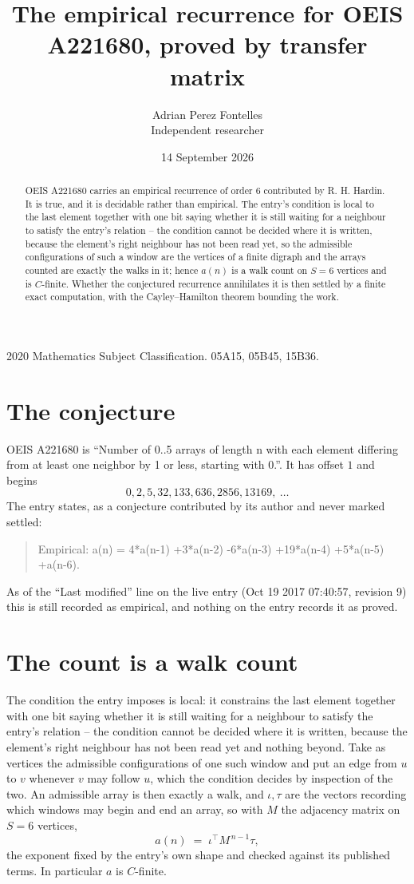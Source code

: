 \documentclass[11pt,a4paper]{article}
\title{The empirical recurrence for OEIS A221680, proved by transfer matrix}
\author{Adrian Perez Fontelles\\ \small Independent researcher}
\date{14 September 2026}
\theoremstyle{plain}
\theoremstyle{definition}
\begin{document}
\maketitle

\begin{abstract}
OEIS A221680 carries an empirical recurrence of order $6$ contributed by R. H. Hardin. It is
true, and it is decidable rather than empirical. The entry's condition is local to the last element together with one bit saying whether it is still waiting for a neighbour to satisfy the entry's relation -- the condition cannot be decided where it is written, because the element's right neighbour has not been read yet, so
the admissible configurations of such a window are the vertices of a finite digraph and the
arrays counted are exactly the walks in it; hence $a(n)$ is a walk count on $S=6$ vertices
and is $C$-finite. Whether the conjectured recurrence annihilates it is then settled by a
finite exact computation, with the Cayley--Hamilton theorem bounding the work.
\end{abstract}

\noindent\small 2020 Mathematics Subject Classification. 05A15, 05B45, 15B36.\normalsize

\section{The conjecture}

OEIS A221680 is ``Number of 0..5 arrays of length n with each element differing from at least one neighbor by 1 or less, starting with 0.''. It has offset $1$ and begins
\[
0, 2, 5, 32, 133, 636, 2856, 13169,\ \dots
\]
The entry states, as a conjecture contributed by its author and never marked settled:
\begin{quote}
Empirical: a(n) = 4*a(n-1) +3*a(n-2) -6*a(n-3) +19*a(n-4) +5*a(n-5) +a(n-6).
\end{quote}
As of the ``Last modified'' line on the live entry (Oct 19 2017 07:40:57, revision 9) this is still
recorded as empirical, and nothing on the entry records it as proved.

\section{The count is a walk count}

The condition the entry imposes is local: it constrains the last element together with one bit saying whether it is still waiting for a neighbour to satisfy the entry's relation -- the condition cannot be decided where it is written, because the element's right neighbour has not been read yet and nothing beyond. Take as vertices the admissible configurations of one such window and put an edge from $u$ to $v$ whenever $v$ may follow $u$, which the condition decides by inspection of the two.
An admissible array is then exactly a walk, and $\iota,\tau$ are the vectors recording which windows may begin and end an array, so with $M$ the adjacency matrix on $S=6$ vertices,
\[
a(n)\;=\;\iota^{\!\top}M^{\,n-1}\tau ,
\]
the exponent fixed by the entry's own shape and checked against its published terms. In
particular $a$ is $C$-finite.
\end{document}
